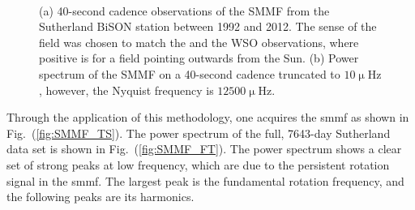 \begin{figure}[ht!]
	\centering
	 \\ 
	\centering
	\caption{(a) 40-second cadence observations of the SMMF from the Sutherland BiSON station between 1992 and 2012. The sense of the field was chosen to match the \citet{chaplin_studies_2003} and the WSO observations, where positive is for a field pointing outwards from the Sun. (b) Power spectrum of the SMMF on a 40-second cadence truncated to $10 \upmu\mathrm{Hz}$, however, the Nyquist frequency is $12500 \upmu\mathrm{Hz}$.}  
	\label{fig:BiSON_SMMF}
\end{figure}

Through the application of this methodology, one acquires the \gls{smmf} as shown in Fig.~(\ref{fig:SMMF_TS}). The power spectrum of the full, 7643-day Sutherland data set is shown in Fig.~(\ref{fig:SMMF_FT}). The power spectrum shows a clear set of strong peaks at low frequency, which are due to the persistent rotation signal in the \gls{smmf}. The largest peak is the fundamental rotation frequency, and the following peaks are its harmonics.


